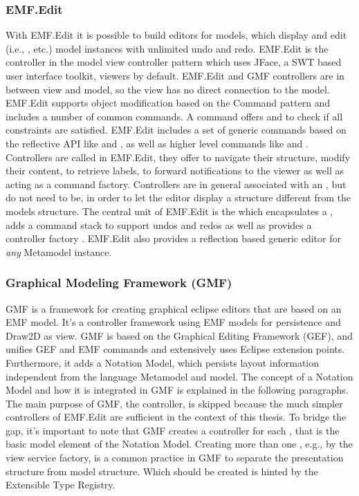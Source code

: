 \subsubsection{EMF.Edit}
With EMF.Edit it is possible to build editors for models, which display and edit (i.e., , etc.) model instances with unlimited undo and redo. EMF.Edit is the controller in the model view controller pattern which uses JFace, a SWT based user interface toolkit, viewers by default. EMF.Edit and GMF controllers are in between view and model, so the view has no direct connection to the model. EMF.Edit supports object modification based on the Command pattern \cite{patterns} and includes a number of common commands. A command offers  and  to check if all constraints are satisfied.  EMF.Edit includes a set of generic commands based on the reflective API like  and , as well as  higher level commands like  and . Controllers are called  in EMF.Edit, they offer to navigate their structure, modify their content, to retrieve labels, to forward notifications to the viewer as well as acting as a command factory. Controllers are in general associated with an , but do not need to be, in order to let the editor display a structure different from the models structure. The central unit of EMF.Edit is the  which encapsulates a , adds a command stack to support undos and redos as well as provides a controller factory \cite{EMF2nd}. EMF.Edit also provides a reflection based generic editor for \emph{any} Metamodel instance.  


\subsubsection {Graphical Modeling Framework (GMF)}
GMF is a framework for creating graphical eclipse editors that are based on an EMF model. It's a controller framework using EMF models for persistence and Draw2D as view. GMF is based on the Graphical Editing Framework (GEF), and unifies GEF and EMF commands and extensively uses Eclipse extension points. Furthermore, it adds a Notation Model, which persists layout information independent from the language Metamodel and model. The concept of a Notation Model and how it is integrated in GMF is explained in the following paragraphs. The main purpose of GMF, the controller, is skipped because the much simpler controllers of EMF.Edit are sufficient in the context of this thesis. To bridge the gap, it's important to note that GMF creates a controller for each , that is the basic model element of the Notation Model. Creating more than one , e.g., by the view service factory, is a common practice in GMF to separate the presentation structure from model structure. Which  should be created is hinted by the Extensible Type Registry.

